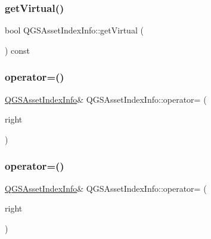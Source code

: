 \subsubsection{\texorpdfstring{get\+Virtual()}{getVirtual()}}
{\footnotesize\ttfamily bool Q\+G\+S\+Asset\+Index\+Info\+::get\+Virtual (\begin{DoxyParamCaption}{ }\end{DoxyParamCaption}) const}

\mbox{\label{class_q_g_s_asset_index_info_aea5f4688c644ab48b28aa4aece3fd286}} 
\subsubsection{\texorpdfstring{operator=()}{operator=()}\hspace{0.1cm}{\footnotesize\ttfamily [1/2]}}
{\footnotesize\ttfamily \mbox{\hyperlink{class_q_g_s_asset_index_info}{Q\+G\+S\+Asset\+Index\+Info}}\& Q\+G\+S\+Asset\+Index\+Info\+::operator= (\begin{DoxyParamCaption}\item[{const \mbox{\hyperlink{class_q_g_s_asset_index_info}{Q\+G\+S\+Asset\+Index\+Info}} \&}]{right }\end{DoxyParamCaption})\hspace{0.3cm}{\ttfamily [default]}}

\mbox{\label{class_q_g_s_asset_index_info_a3d55ef03fba70e2f956771e87d8f45c5}} 
\subsubsection{\texorpdfstring{operator=()}{operator=()}\hspace{0.1cm}{\footnotesize\ttfamily [2/2]}}
{\footnotesize\ttfamily \mbox{\hyperlink{class_q_g_s_asset_index_info}{Q\+G\+S\+Asset\+Index\+Info}}\& Q\+G\+S\+Asset\+Index\+Info\+::operator= (\begin{DoxyParamCaption}\item[{\mbox{\hyperlink{class_q_g_s_asset_index_info}{Q\+G\+S\+Asset\+Index\+Info}} \&\&}]{right }\end{DoxyParamCaption})\hspace{0.3cm}{\ttfamily [default]}}

